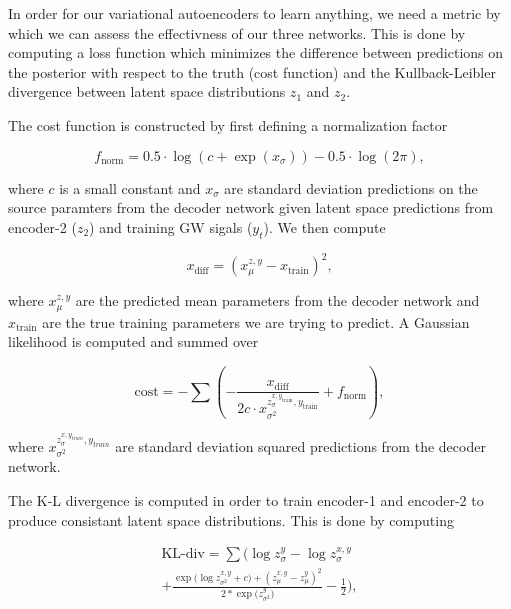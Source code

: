 \documentclass[%
showpacs,
 amsmath,amssymb,
 aps,
 twocolumn,
 prl,
 reprint,
floatfix,
]{revtex4-1}
\begin{document}
%
%
In order for our variational autoencoders to learn anything, we need a metric by which 
we can assess the effectivness of our three networks. This is done by computing 
a loss function which minimizes the difference 
between predictions on the posterior with respect to the truth (cost function) and the Kullback-Leibler divergence 
between latent space distributions $z_1$ and $z_2$. 

%
%
The cost function is constructed by first defining a normalization factor

\begin{equation}
    f_{\textrm{norm}} = 0.5 \cdot \log(c + \exp(x_{\sigma})) - 0.5 \cdot \log(2\pi),
\end{equation}

where $c$ is a small constant and $x_{\sigma}$ are standard deviation predictions 
on the source paramters from the decoder network given latent space predictions 
from encoder-2 ($z_2$) and training GW sigals ($y_{t}$). We then 
compute 

\begin{equation}
    x_{\textrm{diff}} = (x^{z,y}_{\mu} - x_{\textrm{train}})^{2},
\end{equation}

where $x^{z,y}_{\mu}$ are the predicted mean parameters from the decoder network 
and $x_{\textrm{train}}$ are the true training parameters we are 
trying to predict. A Gaussian likelihood is computed and summed over

\begin{equation}
    \textrm{cost} = - \sum (-\frac{x_{\textrm{diff}}}{2c \cdot 
    x^{z^{x,y_{\textrm{train}}}_{\sigma},y_{\textrm{train}}}_{\sigma^{2}}} + f_{\textrm{norm}}),\label{eq:cost}
\end{equation}

where $x^{z^{x,y_{train}}_{\sigma},y_{train}}_{\sigma^{2}}$ are standard deviation squared predictions from the 
decoder network.


%
%
The K-L divergence is computed in order to train 
encoder-1 and encoder-2 to produce consistant latent space 
distributions. This is done by computing 

\begin{equation}
    \begin{split}
    \textrm{KL-div} = \sum(\log{z^{y}_{\sigma}}-\log{z^{x,y}_{\sigma}} \\
    +\frac{\exp{(\log{z^{x,y}_{\sigma^{2}}+c)}}+(z^{x,y}_{\mu}-z^{y}_{\mu})^{2}}{2*\exp{(z^{y}_{\sigma^{2}}})}
    -\frac{1}{2}),\label{eq:kl}
    \end{split}
\end{equation}
\end{document}
